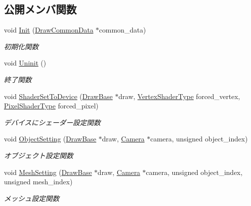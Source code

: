\subsection*{公開メンバ関数}
\begin{DoxyCompactItemize}
\item 
void \mbox{\hyperlink{class_shader_manager_a482286710edced4ec663dfe4e8ff6756}{Init}} (\mbox{\hyperlink{class_draw_common_data}{Draw\+Common\+Data}} $\ast$common\+\_\+data)
\begin{DoxyCompactList}\small\item\em 初期化関数 \end{DoxyCompactList}\item 
void \mbox{\hyperlink{class_shader_manager_afc31a6bbe86e6b57edd7be0972f48ab1}{Uninit}} ()
\begin{DoxyCompactList}\small\item\em 終了関数 \end{DoxyCompactList}\item 
void \mbox{\hyperlink{class_shader_manager_a05693102a283c82768370e37919ffef8}{Shader\+Set\+To\+Device}} (\mbox{\hyperlink{class_draw_base}{Draw\+Base}} $\ast$draw, \mbox{\hyperlink{class_shader_manager_a9b51e49d70eb3cc58f6d1f3994e8cfbd}{Vertex\+Shader\+Type}} forced\+\_\+vertex, \mbox{\hyperlink{class_shader_manager_a7d15d773b3c6a99dd7086c45c8b0be5f}{Pixel\+Shader\+Type}} forced\+\_\+pixel)
\begin{DoxyCompactList}\small\item\em デバイスにシェーダー設定関数 \end{DoxyCompactList}\item 
void \mbox{\hyperlink{class_shader_manager_a401db6f6f5157833ddd3020892ad81b4}{Object\+Setting}} (\mbox{\hyperlink{class_draw_base}{Draw\+Base}} $\ast$draw, \mbox{\hyperlink{class_camera}{Camera}} $\ast$camera, unsigned object\+\_\+index)
\begin{DoxyCompactList}\small\item\em オブジェクト設定関数 \end{DoxyCompactList}\item 
void \mbox{\hyperlink{class_shader_manager_a7551c1c791574973815dd47450ae9124}{Mesh\+Setting}} (\mbox{\hyperlink{class_draw_base}{Draw\+Base}} $\ast$draw, \mbox{\hyperlink{class_camera}{Camera}} $\ast$camera, unsigned object\+\_\+index, unsigned mesh\+\_\+index)
\begin{DoxyCompactList}\small\item\em メッシュ設定関数 \end{DoxyCompactList}\end{DoxyCompactItemize}
